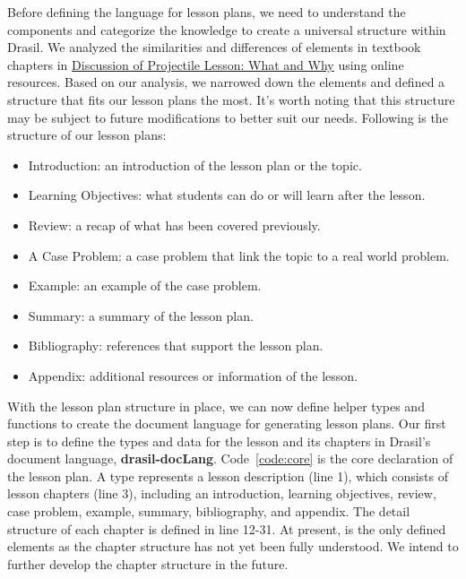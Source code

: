 Before defining the language for lesson plans, we need to understand the 
components and categorize the knowledge to create a universal structure within 
Drasil. We analyzed the similarities and differences of elements in textbook 
chapters in 
\href{https://github.com/smiths/caseStudies/blob/master/CaseStudies/projectile/projectileLesson/AboutProjectileLesson.pdf}{Discussion
 of Projectile Lesson: What and	Why} using online resources. Based on our 
analysis, we narrowed down the elements and defined a structure that fits our 
lesson plans the most. It's worth noting that this structure may be subject to 
future modifications to better suit our needs. Following is the structure of
our lesson plans:
\begin{itemize}
	\item Introduction: an introduction of the lesson plan or the topic.
	\item Learning Objectives: what students can do or will learn after the 
	lesson.  
	\item Review: a recap of what has been covered previously.
	\item A Case Problem: a case problem that link the topic to a real world 
	problem.
	\item Example: an example of the case problem.
	\item Summary: a summary of the lesson plan.
	\item Bibliography: references that support the lesson plan.
	\item Appendix: additional resources or information of the lesson.
\end{itemize}

With the lesson plan structure in place, we can now define helper types and 
functions to create the document language for generating lesson plans. Our 
first step is to define the types and data for the lesson and its chapters in 
Drasil's document language, \textbf{drasil-docLang}. Code~\ref{code:core} is 
the core declaration of the lesson plan. A  type represents a 
lesson description (line 1), which consists of lesson chapters (line 3), 
including an introduction, learning objectives, review, case problem, example, 
summary, bibliography, and appendix. The detail structure of each chapter is 
defined in line 12-31. At present,  is the only defined 
elements as the chapter structure has not yet been fully understood. We intend 
to further develop the chapter structure in the future.  

